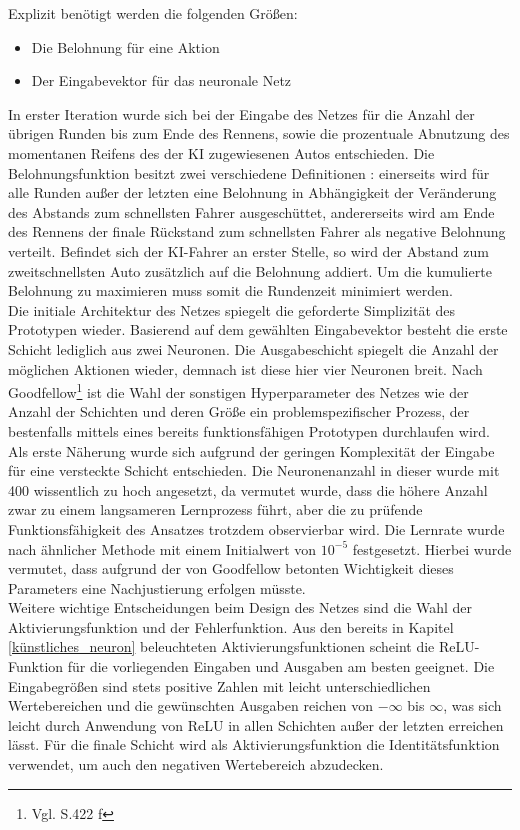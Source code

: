 Explizit benötigt werden die folgenden Größen:
\begin{itemize}
    \item Die Belohnung für eine Aktion
    \item Der Eingabevektor für das neuronale Netz
\end{itemize}
In erster Iteration wurde sich bei der Eingabe des Netzes für die Anzahl der übrigen Runden bis zum Ende des Rennens, sowie die prozentuale Abnutzung des momentanen Reifens des der KI zugewiesenen Autos entschieden. Die Belohnungsfunktion besitzt zwei verschiedene Definitionen : einerseits wird für alle Runden außer der letzten eine Belohnung in Abhängigkeit der Veränderung des Abstands zum schnellsten Fahrer ausgeschüttet, andererseits wird am Ende des Rennens der finale Rückstand zum schnellsten Fahrer als negative Belohnung verteilt. Befindet sich der KI-Fahrer an erster Stelle, so wird der Abstand zum zweitschnellsten Auto zusätzlich auf die Belohnung addiert. Um die kumulierte Belohnung zu maximieren muss somit die Rundenzeit minimiert werden.\\
Die initiale Architektur des Netzes spiegelt die geforderte Simplizität des Prototypen wieder. Basierend auf dem gewählten Eingabevektor besteht die erste Schicht lediglich aus zwei Neuronen. Die Ausgabeschicht spiegelt die Anzahl der möglichen Aktionen wieder, demnach ist diese hier vier Neuronen breit. Nach Goodfellow\footnote{Vgl. \cite{goodfellow_deep_learning} S.422 f} ist die Wahl der sonstigen Hyperparameter des Netzes wie der Anzahl der Schichten und deren Größe ein problemspezifischer Prozess, der bestenfalls mittels eines bereits funktionsfähigen Prototypen durchlaufen wird. Als erste Näherung wurde sich aufgrund der geringen Komplexität der Eingabe für eine versteckte Schicht entschieden. Die Neuronenanzahl in dieser wurde mit 400 wissentlich zu hoch angesetzt, da vermutet wurde, dass die höhere Anzahl zwar zu einem langsameren Lernprozess führt, aber die zu prüfende Funktionsfähigkeit des Ansatzes trotzdem observierbar wird. Die Lernrate wurde nach ähnlicher Methode mit einem Initialwert von \(10^{-5}\) festgesetzt. Hierbei wurde vermutet, dass aufgrund der von Goodfellow betonten Wichtigkeit dieses Parameters eine Nachjustierung erfolgen müsste.\\
Weitere wichtige Entscheidungen beim Design des Netzes sind die Wahl der Aktivierungsfunktion und der Fehlerfunktion. Aus den bereits in Kapitel \ref{künstliches_neuron} beleuchteten Aktivierungsfunktionen scheint die ReLU-Funktion für die vorliegenden Eingaben und Ausgaben am besten geeignet. Die Eingabegrößen sind stets positive Zahlen mit leicht unterschiedlichen Wertebereichen und die gewünschten Ausgaben reichen von \(-\infty\) bis \(\infty\), was sich leicht durch Anwendung von ReLU in allen Schichten außer der letzten erreichen lässt. Für die finale Schicht wird als Aktivierungsfunktion die Identitätsfunktion verwendet, um auch den negativen Wertebereich abzudecken.

